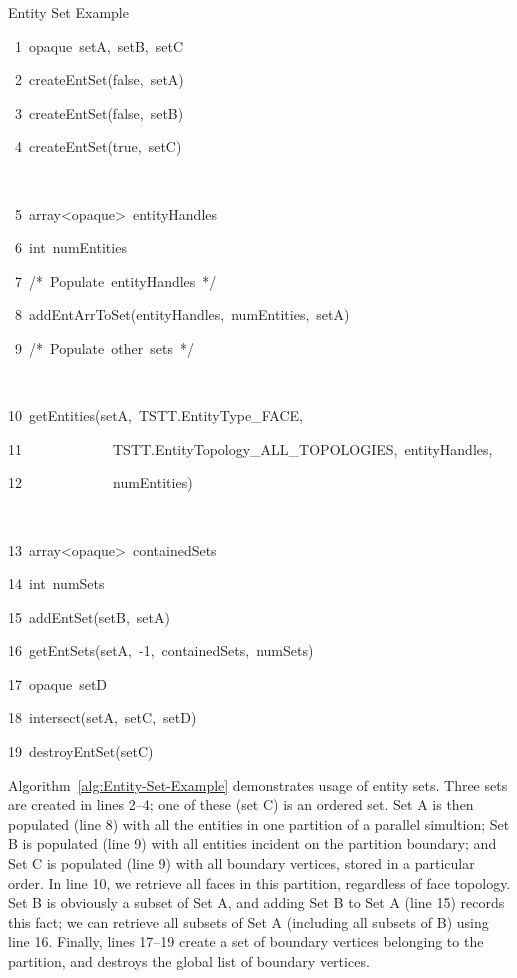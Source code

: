 %
\begin{algorithm}

\caption{Entity Set Example\label{alg:Entity-Set-Example}}

\begin{lyxcode}
~1~opaque~setA,~setB,~setC

~2~createEntSet(false,~setA)

~3~createEntSet(false,~setB)

~4~createEntSet(true,~setC)

~

~5~array<opaque>~entityHandles

~6~int~numEntities

~7~/{*}~Populate~entityHandles~{*}/

~8~addEntArrToSet(entityHandles,~numEntities,~setA)

~9~/{*}~Populate~other~sets~{*}/

~

10~getEntities(setA,~TSTT.EntityType\_FACE,~

11~~~~~~~~~~~~~TSTT.EntityTopology\_ALL\_TOPOLOGIES,~entityHandles,~

12~~~~~~~~~~~~~numEntities)

~

13~array<opaque>~containedSets

14~int~numSets

15~addEntSet(setB,~setA)

16~getEntSets(setA,~-1,~containedSets,~numSets)



17~opaque~setD

18~intersect(setA,~setC,~setD)

19~destroyEntSet(setC)
\end{lyxcode}

\end{algorithm}

Algorithm~\ref{alg:Entity-Set-Example} demonstrates usage of entity
sets. Three sets are created in lines 2--4; one of these (set C) is
an ordered set. Set A is then populated (line 8) with all the entities
in one partition of a parallel simultion; Set B is populated (line
9) with all entities incident on the partition boundary; and Set C
is populated (line 9) with all boundary vertices, stored in a particular
order. In line 10, we retrieve all faces in this partition, regardless
of face topology. Set B is obviously a subset of Set A, and adding
Set B to Set A (line 15) records this fact; we can retrieve all subsets
of Set A (including all subsets of B) using line 16. Finally, lines
17--19 create a set of boundary vertices belonging to the partition,
and destroys the global list of boundary vertices.


